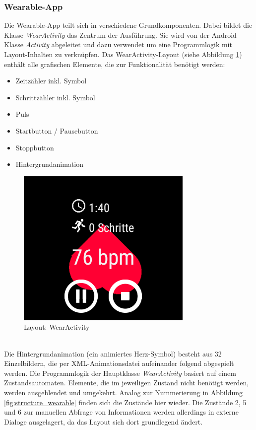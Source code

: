 \subsubsection{Wearable-App}
Die Wearable-App teilt sich in verschiedene Grundkomponenten. Dabei bildet die Klasse \textit{WearActivity} das Zentrum der Ausführung. Sie wird von der Android-Klasse \textit{Activity} abgeleitet und dazu verwendet um eine Programmlogik mit Layout-Inhalten zu verknüpfen. Das WearActivity-Layout (siehe Abbildung \ref{fig:layout_wearactivity}) enthält alle grafischen Elemente, die zur Funktionalität benötigt werden:\\
\begin{minipage}[c]{0.5\textwidth}
	\begin{itemize}
		\item Zeitzähler inkl. Symbol
		\item Schrittzähler inkl. Symbol
		\item Puls
		\item Startbutton / Pausebutton
		\item Stoppbutton
		\item Hintergrundanimation
	\end{itemize}
\end{minipage}
\begin{minipage}[c]{0.5\textwidth}
	\begin{figure}[H]
		\centering
		\includegraphics[scale=0.55]{images/layout_wearactivity.png}
		\caption{Layout: WearActivity}
		\label{fig:layout_wearactivity}
	\end{figure}
\end{minipage}
\\[0.7cm]
Die Hintergrundanimation (ein animiertes Herz-Symbol) besteht aus 32 Einzelbildern, die per XML-Animationsdatei aufeinander folgend abgespielt werden. Die Programmlogik der Hauptklasse \textit{WearActivity} basiert auf einem Zustandsautomaten. Elemente, die im jeweiligen Zustand nicht benötigt werden, werden ausgeblendet und umgekehrt. Analog zur Nummerierung in Abbildung \ref{fig:structure_wearable} finden sich die Zustände hier wieder. Die Zustände 2, 5 und 6 zur manuellen Abfrage von Informationen werden allerdings in externe Dialoge ausgelagert, da das Layout sich dort grundlegend ändert.
